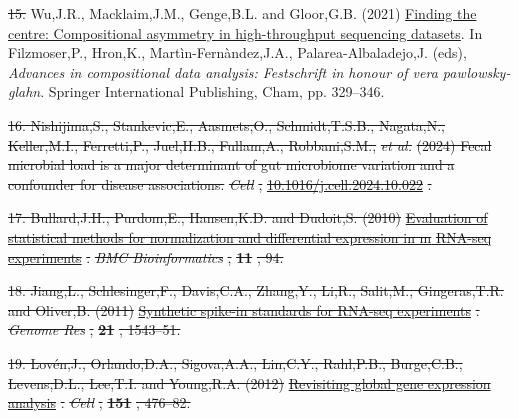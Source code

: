 \documentclass[
]{article}
\newlength{\cslhangindent}
\newenvironment{CSLReferences}[2] %
 {\begin{list}{}{%
  \setlength{\itemindent}{0pt}
  \setlength{\leftmargin}{0pt}
  \setlength{\parsep}{0pt}
  \ifodd #1
   \setlength{\leftmargin}{\cslhangindent}
   \setlength{\itemindent}{-1\cslhangindent}
  \fi
  \setlength{\itemsep}{#2\baselineskip}}}
 {\end{list}}
\providecommand{\DIFadd}[1]{{\protect\color{blue}\uwave{#1}}} %
\providecommand{\DIFdel}[1]{{\protect\color{red}\sout{#1}}}                      %
\providecommand{\DIFaddbegin}{} %
\providecommand{\DIFaddend}{} %
\providecommand{\DIFdelbegin}{} %
\providecommand{\DIFdelend}{} %
\newcommand{\DIFscaledelfig}{0.5}
\newlength{\DIFdelgraphicswidth} %
\newlength{\DIFdelgraphicsheight} %
\newcommand{\DIFaddincludegraphics}[2][]{{\color{blue}\fbox{\DIFOincludegraphics[#1]{#2}}}} %
\newcommand{\DIFdelincludegraphics}[2][]{%
\sbox{\DIFdelgraphicsbox}{\DIFOincludegraphics[#1]{#2}}%
\settoboxwidth{\DIFdelgraphicswidth}{\DIFdelgraphicsbox} %
\settoboxtotalheight{\DIFdelgraphicsheight}{\DIFdelgraphicsbox} %
\scalebox{\DIFscaledelfig}{%
\parbox[b]{\DIFdelgraphicswidth}{\usebox{\DIFdelgraphicsbox}\\[-\baselineskip] \rule{\DIFdelgraphicswidth}{0em}}\llap{\resizebox{\DIFdelgraphicswidth}{\DIFdelgraphicsheight}{%
\setlength{\unitlength}{\DIFdelgraphicswidth}%
\begin{picture}(1,1)%
\thicklines\linethickness{2pt} %
{\color[rgb]{1,0,0}\put(0,0){\framebox(1,1){}}}%
{\color[rgb]{1,0,0}\put(0,0){\line( 1,1){1}}}%
{\color[rgb]{1,0,0}\put(0,1){\line(1,-1){1}}}%
\end{picture}%
}\hspace*{3pt}}} %
} %
\DeclareRobustCommand{\DIFaddbegin}{\DIFOaddbegin \let\includegraphics\DIFaddincludegraphics} %
\DeclareRobustCommand{\DIFaddend}{\DIFOaddend \let\includegraphics\DIFOincludegraphics} %
\DeclareRobustCommand{\DIFdelbegin}{\DIFOdelbegin \let\includegraphics\DIFdelincludegraphics} %
\DeclareRobustCommand{\DIFdelend}{\DIFOaddend \let\includegraphics\DIFOincludegraphics} %
\begin{document}
\begin{CSLReferences}{1}{1}
\DIFdelend {}
\DIFdelbegin \DIFdel{15. }\DIFdelend \DIFaddbegin \DIFadd{19. }\DIFaddend Wu,J.R., Macklaim,J.M., Genge,B.L. and Gloor,G.B. (2021)
\href{https://doi.org/10.1007/978-3-030-71175-7_17}{Finding the centre:
Compositional asymmetry in high-throughput sequencing datasets}. In
Filzmoser,P., Hron,K., Martìn-Fernàndez,J.A., Palarea-Albaladejo,J.
(eds), \emph{Advances in compositional data analysis: Festschrift in
honour of vera pawlowsky-glahn}. Springer International Publishing,
Cham, pp. 329--346.

\DIFdelbegin {}
\DIFdel{16. Nishijima,S., Stankevic,E., Aasmets,O., Schmidt,T.S.B., Nagata,N.,
Keller,M.I., Ferretti,P., Juel,H.B., Fullam,A., Robbani,S.M., }\emph{\DIFdel{et
al.}} %
\DIFdel{(2024) Fecal microbial load is a major determinant of gut
microbiome variation and a confounder for disease associations.
}\emph{\DIFdel{Cell}}%
\DIFdel{,
}\href{https://doi.org/10.1016/j.cell.2024.10.022}{\DIFdel{10.1016/j.cell.2024.10.022}}%
\DIFdel{.
}%

\DIFdel{17. Bullard,J.H., Purdom,E., Hansen,K.D. and Dudoit,S. (2010)
}\href{https://doi.org/10.1186/1471-2105-11-94}{\DIFdel{Evaluation of statistical
methods for normalization and differential expression in m}%
\DIFdel{RNA-seq}%
\DIFdel{experiments}}%
\DIFdel{. }\emph{\DIFdel{BMC Bioinformatics}}%
\DIFdel{, }\textbf{\DIFdel{11}}%
\DIFdel{, 94.
}%

\DIFdel{18. Jiang,L., Schlesinger,F., Davis,C.A., Zhang,Y., Li,R., Salit,M.,
Gingeras,T.R. and Oliver,B. (2011)
}\href{https://doi.org/10.1101/gr.121095.111}{\DIFdel{Synthetic spike-in
standards for RNA-seq experiments}}%
\DIFdel{. }\emph{\DIFdel{Genome Res}}%
\DIFdel{, }\textbf{\DIFdel{21}}%
\DIFdel{,
1543--51.
}%

\DIFdel{19. Lovén,J., Orlando,D.A., Sigova,A.A., Lin,C.Y., Rahl,P.B.,
Burge,C.B., Levens,D.L., Lee,T.I. and Young,R.A. (2012)
}\href{https://doi.org/10.1016/j.cell.2012.10.012}{\DIFdel{Revisiting global gene
expression analysis}}%
\DIFdel{. }\emph{\DIFdel{Cell}}%
\DIFdel{, }\textbf{\DIFdel{151}}%
\DIFdel{, 476--82.
}%


\end{CSLReferences}
\end{document}

